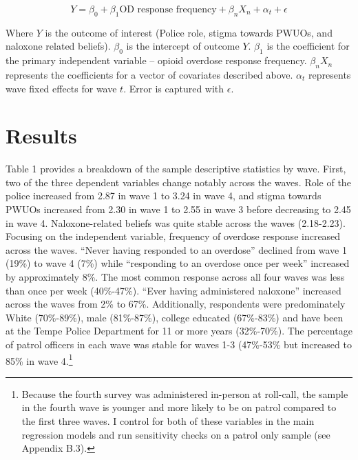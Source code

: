 \[Y = \beta_0 + \beta_1 \text{OD response frequency} + \beta_n X_n + \alpha_t + \epsilon \]

Where \(Y\) is the outcome of interest (Police role, stigma towards PWUOs, and naloxone related beliefs). \(\beta_0\) is the intercept of outcome \(Y\). \(\beta_1\) is the coefficient for the primary independent variable -- opioid overdose response frequency. \(\beta_n X_n\) represents the coefficients for a vector of covariates described above. \(\alpha_t\) represents wave fixed effects for wave \(t\). Error is captured with \(\epsilon\).

\section{Results}

Table 1 provides a breakdown of the sample descriptive statistics by wave. First, two of the three dependent variables change notably across the waves. Role of the police increased from 2.87 in wave 1 to 3.24 in wave 4, and stigma towards PWUOs increased from 2.30 in wave 1 to 2.55 in wave 3 before decreasing to 2.45 in wave 4. Naloxone-related beliefs was quite stable across the waves (2.18-2.23). Focusing on the independent variable, frequency of overdose response increased across the waves. “Never having responded to an overdose” declined from wave 1 (19\%) to wave 4 (7\%) while “responding to an overdose once per week” increased by approximately 8\%. The most common response across all four waves was less than once per week (40\%-47\%). “Ever having administered naloxone” increased across the waves from 2\% to 67\%. Additionally, respondents were predominately White (70\%-89\%), male (81\%-87\%), college educated (67\%-83\%) and have been at the Tempe Police Department for 11 or more years (32\%-70\%). The percentage of patrol officers in each wave was stable for waves 1-3 (47\%-53\% but increased to 85\% in wave 4.\footnote{Because the fourth survey was administered in-person at roll-call, the sample in the fourth wave is younger and more likely to be on patrol compared to the first three waves. I control for both of these variables in the main regression models and run sensitivity checks on a patrol only sample (see Appendix B.3).} 


